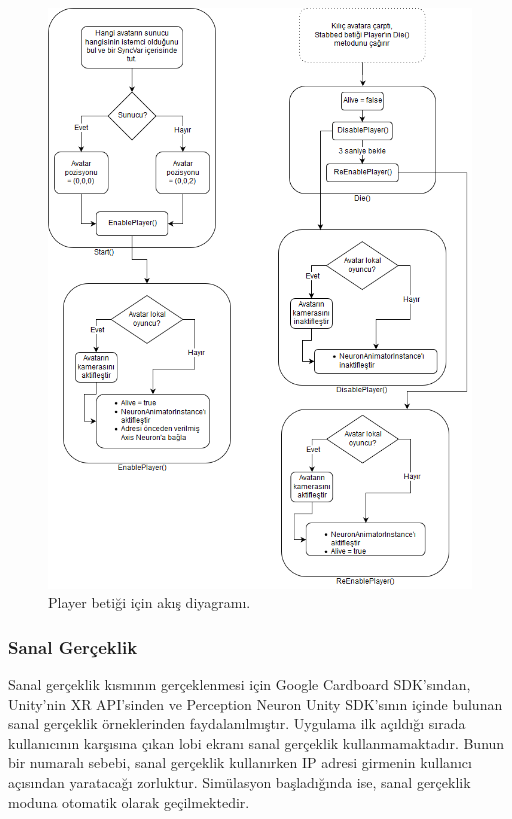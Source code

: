 \documentclass[a4paper, 12pt, titlepage]{article}
\begin{document}
\begin{figure}[ht!]
    \centering
        \includegraphics[width=6in]{images/player}
    \caption{Player betiği için akış diyagramı.}
    \label{player}
\end{figure}

\vfill
\clearpage

\subsubsection{Sanal Gerçeklik}

Sanal gerçeklik kısmının gerçeklenmesi için Google Cardboard SDK’sından, Unity’nin XR API’sinden ve
Perception Neuron Unity SDK’sının içinde bulunan sanal gerçeklik örneklerinden faydalanılmıştır.
Uygulama ilk açıldığı sırada kullanıcının karşısına çıkan lobi ekranı sanal gerçeklik
kullanmamaktadır. Bunun bir numaralı sebebi, sanal gerçeklik kullanırken IP adresi girmenin
kullanıcı açısından yaratacağı zorluktur. Simülasyon başladığında ise, sanal gerçeklik moduna
otomatik olarak geçilmektedir.
\end{document}
